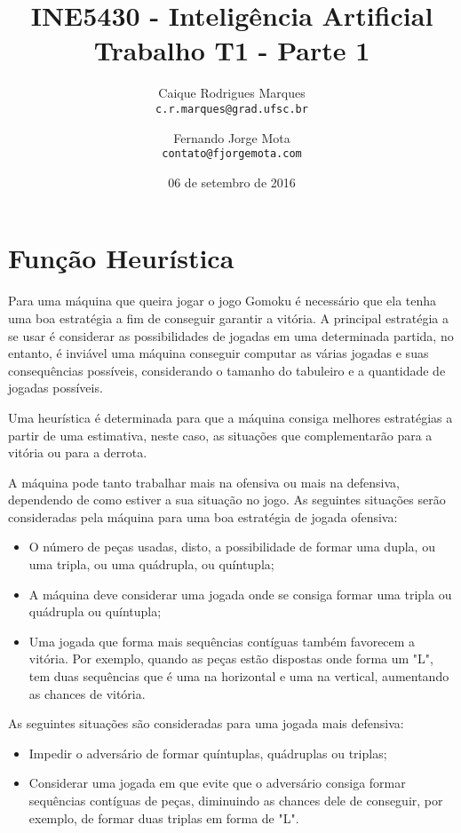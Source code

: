 \documentclass{article}
\title{\textbf{INE5430 - Inteligência Artificial \\
        \large Trabalho T1 - Parte 1}}
\author{
    Caique Rodrigues Marques \\
    {\texttt{c.r.marques@grad.ufsc.br}}
    \and
    Fernando Jorge Mota \\
    {\texttt{contato@fjorgemota.com}}
    \vspace{-5mm}
}
\date{06 de setembro de 2016}
\begin{document}
\maketitle

\section*{Função Heurística}
    Para uma máquina que queira jogar o jogo Gomoku é necessário que ela tenha
    uma boa estratégia a fim de conseguir garantir a vitória. A principal
    estratégia a se usar é considerar as possibilidades de jogadas em uma
    determinada partida, no entanto, é inviável uma máquina conseguir computar
    as várias jogadas e suas consequências possíveis, considerando o tamanho do
    tabuleiro e a quantidade de jogadas possíveis.
    
    Uma heurística é determinada para que a máquina consiga melhores
    estratégias a partir de uma estimativa, neste caso, as situações que
    complementarão para a vitória ou para a derrota.
    
    A máquina pode tanto trabalhar mais na ofensiva ou mais na defensiva,
    dependendo de como estiver a sua situação no jogo. As seguintes situações
    serão consideradas pela máquina para uma boa estratégia de jogada ofensiva:
    
    \begin{itemize}
        \item O número de peças usadas, disto, a possibilidade de formar uma
            dupla, ou uma tripla, ou uma quádrupla, ou quíntupla;
        \item A máquina deve considerar uma jogada onde se consiga formar uma
            tripla ou quádrupla ou quíntupla;
        \item Uma jogada que forma mais sequências contíguas também favorecem a
            vitória. Por exemplo, quando as peças estão dispostas onde forma um
            "L", tem duas sequências que é uma na horizontal e uma na vertical,
            aumentando as chances de vitória.
    \end{itemize}
    
    As seguintes situações são consideradas para uma jogada mais defensiva:
    
    \begin{itemize}
        \item Impedir o adversário de formar quíntuplas, quádruplas ou triplas;
        \item Considerar uma jogada em que evite que o adversário consiga
            formar sequências contíguas de peças, diminuindo as chances dele de
            conseguir, por exemplo, de formar duas triplas em forma de "L".
    \end{itemize}
    
\end{document}

